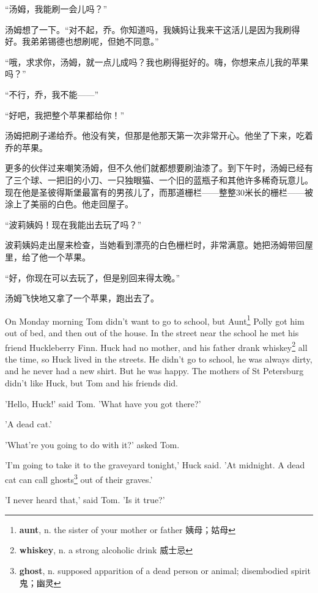 \documentclass[fontset=ubuntu, zihao=5]{ctexart}
\begin{document}
\begin{paracol}{2}
“汤姆，我能刷一会儿吗？”

汤姆想了一下。“对不起，乔。你知道吗，我姨妈让我来干这活儿是因为我刷得好。我弟弟锡德也想刷呢，但她不同意。”

“哦，求求你，汤姆，就一点儿成吗？我也刷得挺好的。嗨，你想来点儿我的苹果吗？”

“不行，乔，我不能——”

“好吧，我把整个苹果都给你！”

汤姆把刷子递给乔。他没有笑，但那是他那天第一次非常开心。他坐了下来，吃着乔的苹果。

更多的伙伴过来嘲笑汤姆，但不久他们就都想要刷油漆了。到下午时，汤姆已经有了三个球、一把旧的小刀、一只独眼猫、一个旧的蓝瓶子和其他许多稀奇玩意儿。现在他是圣彼得斯堡最富有的男孩儿了，而那道栅栏——整整30米长的栅栏——被涂上了美丽的白色。他走回屋子。

“波莉姨妈！现在我能出去玩了吗？”

波莉姨妈走出屋来检查，当她看到漂亮的白色栅栏时，非常满意。她把汤姆带回屋里，给了他一个苹果。

“好，你现在可以去玩了，但是别回来得太晚。”

汤姆飞快地又拿了一个苹果，跑出去了。

\switchcolumn*

\sectionbreak

On Monday morning Tom didn't want to go to school, but Aunt\footnote{\textbf{aunt}, n.
  the sister of your mother or father 姨母；姑母} Polly got him out of bed,
and then out of the house. In the street near the school he met his friend
Huckleberry Finn. Huck had no mother, and his father drank whiskey\footnote{\textbf{whiskey}, n. a strong alcoholic drink 威士忌} all the
time, so Huck lived in the streets. He didn't go to school, he was always
dirty, and he never had a new shirt. But he was happy. The mothers of St
Petersburg didn't like Huck, but Tom and his friends did.



'Hello, Huck!' said Tom. 'What have you got there?'

'A dead cat.'

'What're you going to do with it?' asked Tom.

'I'm going to take it to the graveyard tonight,' Huck said. 'At midnight. A dead cat can call ghosts\footnote{\textbf{ghost}, n. supposed apparition of a dead person or animal; disembodied spirit 鬼；幽灵} out of their graves.'

'I never heard that,' said Tom. 'Is it true?'


\end{paracol}
\end{document}

